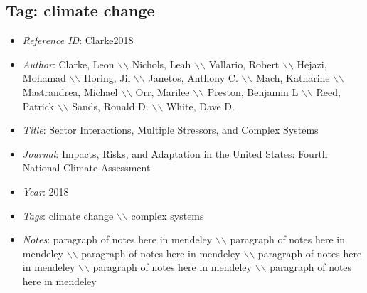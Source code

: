 \documentclass[11pt]{article}
\begin{document}
\subsection{Tag: climate change} 
\noindent\citep{Clarke2018} 
\begin{itemize} 
\item{\textit{Reference ID}:  Clarke2018} 

\item{\textit{Author}:  Clarke, Leon $\backslash$$\backslash$ Nichols, Leah $\backslash$$\backslash$ Vallario, Robert $\backslash$$\backslash$ Hejazi, Mohamad $\backslash$$\backslash$ Horing, Jil $\backslash$$\backslash$ Janetos, Anthony C. $\backslash$$\backslash$ Mach, Katharine $\backslash$$\backslash$ Mastrandrea, Michael $\backslash$$\backslash$ Orr, Marilee $\backslash$$\backslash$ Preston, Benjamin L $\backslash$$\backslash$ Reed, Patrick $\backslash$$\backslash$ Sands, Ronald D. $\backslash$$\backslash$ White, Dave D.} 

\item{\textit{Title}:  Sector Interactions, Multiple Stressors, and Complex Systems} 

\item{\textit{Journal}:  Impacts, Risks, and Adaptation in the United States: Fourth National Climate Assessment} 

\item{\textit{Year}:  2018} 

\item{\textit{Tags}:  climate change $\backslash$$\backslash$ complex systems} 

\item{\textit{Notes}:  paragraph of notes here in mendeley $\backslash$$\backslash$ paragraph of notes here in mendeley $\backslash$$\backslash$ paragraph of notes here in mendeley $\backslash$$\backslash$ paragraph of notes here in mendeley $\backslash$$\backslash$ paragraph of notes here in mendeley $\backslash$$\backslash$ paragraph of notes here in mendeley} 

\end{itemize}\medskip
\end{document}
